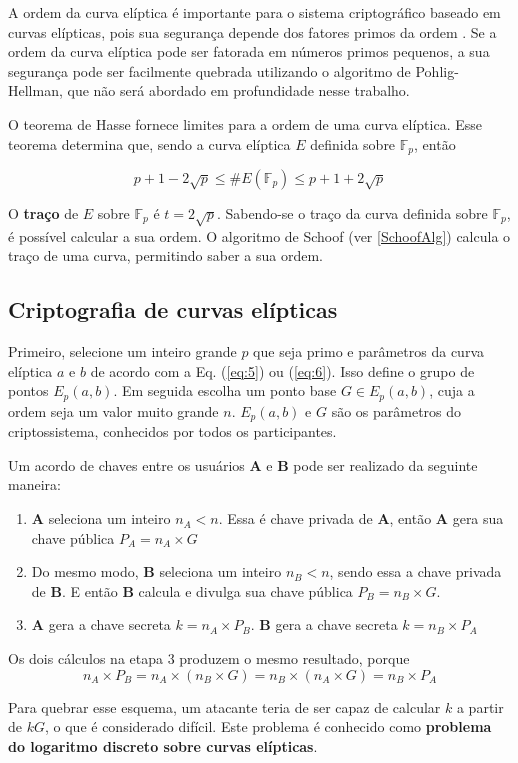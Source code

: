 A ordem da curva elíptica é importante para o sistema criptográfico baseado em curvas elípticas, pois sua segurança depende dos fatores primos da ordem \cite{Alvarado:2005}. Se a ordem da curva elíptica pode ser fatorada em números primos pequenos, a sua segurança pode ser facilmente quebrada utilizando o algoritmo de Pohlig-Hellman, que não será abordado em profundidade nesse trabalho.

O teorema de Hasse fornece limites para a ordem de uma curva elíptica. Esse teorema determina que, sendo a curva elíptica $E$ definida sobre $\mathbb{F}_p$, então

\begin{equation}
p + 1 - 2\sqrt{p} \leq \#E(\mathbb{F}_p) \leq p + 1 + 2\sqrt{p}
\label{eq:HasseBounds}
\end{equation}

O \textbf{traço} de $E$ sobre $\mathbb{F}_p$ é $t = 2\sqrt{p}$. Sabendo-se o traço da curva definida sobre $\mathbb{F}_p$, é possível calcular a sua ordem. O algoritmo de Schoof (ver \ref{SchoofAlg}) calcula o traço de uma curva, permitindo saber a sua ordem.

%
%
\subsection{Criptografia de curvas elípticas} \label{sec:ecc}
Primeiro, selecione um inteiro grande \(p\) que seja primo e parâmetros da curva elíptica \(a\) e \(b\) de acordo com a Eq. (\ref{eq:5}) ou (\ref{eq:6}). Isso define o grupo de pontos $E_p(a, b)$. Em seguida escolha um ponto base $G \in E_p(a, b)$, cuja a ordem seja um valor muito grande \(n\). $E_p(a, b)$ e \(G\) são os parâmetros do criptossistema, conhecidos por todos os participantes.

Um acordo de chaves entre os usuários \textbf{A} e \textbf{B} pode ser realizado da seguinte maneira:
\begin{enumerate}
\item \textbf{A} seleciona um inteiro \(n_A < n\). Essa é chave privada de \textbf{A}, então \textbf{A} gera sua chave pública $P_A = n_A \times G$
\item Do mesmo modo, \textbf{B} seleciona um inteiro \(n_B < n\), sendo essa a chave privada de \textbf{B}. E então \textbf{B} calcula e divulga sua chave pública $P_B = n_B \times G$.
\item \textbf{A} gera a chave secreta $k = n_A \times P_B$. \textbf{B} gera a chave secreta $k = n_B \times P_A$
\end{enumerate}

Os dois cálculos na etapa 3 produzem o mesmo resultado, porque
\begin{equation*}
n_A \times P_B = n_A \times (n_B \times G) = n_B \times (n_A \times G) = n_B \times P_A
\end{equation*}

Para quebrar esse esquema, um atacante teria de ser capaz de calcular \(k\) a partir de \(kG\), o que é considerado difícil. Este problema é conhecido como \textbf{problema do logaritmo discreto sobre curvas elípticas}.
